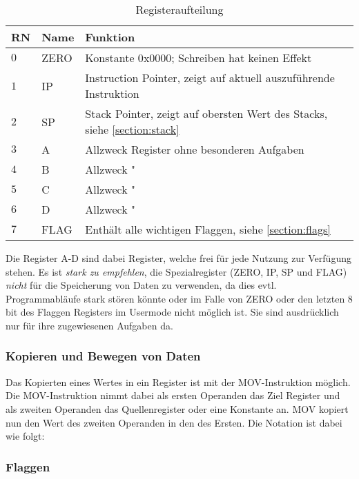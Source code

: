 \documentclass{scrartcl}
\begin{document}
\begin{center}
	\begin{table}[h]
		\caption{\label{table:register} Registeraufteilung}
		\begin{tabular}{l | l | l}
			RN & Name & Funktion\\
			\hline
			$0$ & ZERO & Konstante $0\text{x}0000$; Schreiben hat keinen Effekt\\
			$1$ & IP & Instruction Pointer, zeigt auf aktuell auszuführende Instruktion\\
			$2$ & SP & Stack Pointer, zeigt auf obersten Wert des Stacks, siehe \ref{section:stack} \\
			$3$ & A & Allzweck Register ohne besonderen Aufgaben \\
			$4$ & B & Allzweck " \\
			$5$ & C & Allzweck " \\
			$6$ & D & Allzweck " \\
			$7$ & FLAG & Enthält alle wichtigen Flaggen, siehe \autoref{section:flags} \\
		\end{tabular}
	\end{table}
\end{center}

Die Register A-D sind dabei Register, welche frei für jede Nutzung zur Verfügung stehen. Es ist \emph{stark zu empfehlen}, die Spezialregister (ZERO, IP, SP und FLAG) \emph{nicht} für die Speicherung von Daten zu verwenden, da dies evtl. Programmabläufe stark stören könnte oder im Falle von ZERO oder den letzten 8 bit des Flaggen Registers im Usermode nicht möglich ist. Sie sind ausdrücklich nur für ihre zugewiesenen Aufgaben da.

\subsubsection{\label{section:DataMov} Kopieren und Bewegen von Daten}

Das Kopierten eines Wertes in ein Register ist mit der MOV-Instruktion möglich. Die MOV-Instruktion nimmt dabei als ersten Operanden das Ziel Register und als zweiten Operanden das Quellenregister oder eine Konstante an. MOV kopiert nun den Wert des zweiten Operanden in den des Ersten. Die Notation ist dabei wie folgt: 




\subsubsection{\label{section:flags}Flaggen}
\end{document}
